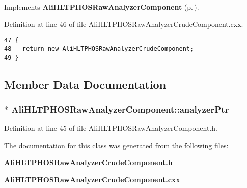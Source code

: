 Implements {\bf Ali\-HLTPHOSRaw\-Analyzer\-Component} {\rm (p.\,\pageref{classAliHLTPHOSRawAnalyzerComponent_AliHLTPHOSRawAnalyzerComponenta17})}.

Definition at line 46 of file Ali\-HLTPHOSRaw\-Analyzer\-Crude\-Component.cxx.

\footnotesize\begin{verbatim}47 {
48   return new AliHLTPHOSRawAnalyzerCrudeComponent;
49 }
\end{verbatim}\normalsize 




\subsection{Member Data Documentation}
\subsubsection{$\ast$ {\bf Ali\-HLTPHOSRaw\-Analyzer\-Component::analyzer\-Ptr}\hspace{0.3cm}{\tt  [protected, inherited]}}\label{classAliHLTPHOSRawAnalyzerComponent_AliHLTPHOSRawAnalyzerPeakFinderComponentp0}




Definition at line 45 of file Ali\-HLTPHOSRaw\-Analyzer\-Component.h.

The documentation for this class was generated from the following files:\begin{CompactItemize}
\item 
{\bf Ali\-HLTPHOSRaw\-Analyzer\-Crude\-Component.h}\item 
{\bf Ali\-HLTPHOSRaw\-Analyzer\-Crude\-Component.cxx}\end{CompactItemize}
